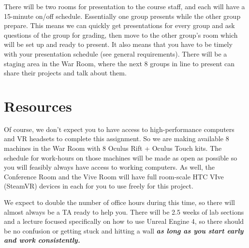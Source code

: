 \documentclass[12pt]{article}
\begin{document}
There will be two rooms for presentation to the course staff, and each will have a 15-minute on/off schedule.  Essentially one group presents while the other group prepare.  This means we can quickly get presentations for every group and ask questions of the group for grading, then move to the other group’s room which will be set up and ready to present.  It also means that you have to be timely with your presentation schedule (see general requirements).  There will be a staging area in the War Room, where the next 8 groups in line to present can share their projects and talk about them.


\section{Resources}
Of course, we don’t expect you to have access to high-performance computers and VR headsets to complete this assignment.  So we are making available 8 machines in the War Room with 8 Oculus Rift + Oculus Touch kits.  The schedule for work-hours on those machines will be made as open as possible so you will feasibly always have access to working computers.  As well, the Conference Room and the Vive Room will have full room-scale HTC VIve (SteamVR) devices in each for you to use freely for this project.  

We expect to double the number of office hours during this time, so there will almost always be a TA ready to help you.  There will be 2.5 weeks of lab sections and a lecture focused specifically on how to use Unreal Engine 4, so there should be no confusion or getting stuck and hitting a wall\textit{\textbf{ as long as you start early and work consistently. }}
\end{document}
